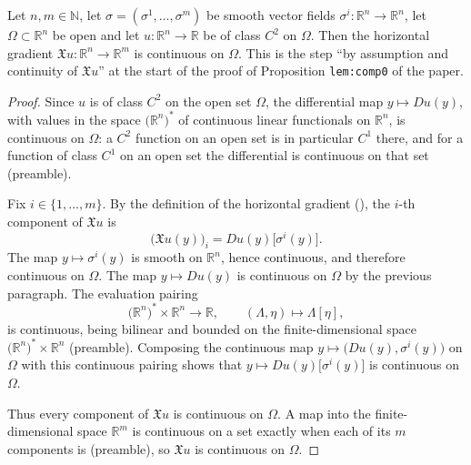 \begin{lemma}
Let $n,m\in\mathbb{N}$, let $\sigma=(\sigma^1,\dots,\sigma^m)$ be smooth vector fields
$\sigma^i:\mathbb{R}^n\to\mathbb{R}^n$, let $\Omega\subset\mathbb{R}^n$ be open and let
$u:\mathbb{R}^n\to\mathbb{R}$ be of class $C^2$ on $\Omega$. Then the horizontal gradient
$\mathfrak{X}u:\mathbb{R}^n\to\mathbb{R}^m$ is continuous on $\Omega$. This is the step ``by
assumption and continuity of $\mathfrak{X}u$'' at the start of the proof of Proposition
\texttt{lem:comp0} of the paper.
\end{lemma}
\begin{proof}
Since $u$ is of class $C^2$ on the open set $\Omega$, the differential map
$y\mapsto Du(y)$, with values in the space $\big(\mathbb{R}^n\big)^*$ of continuous linear
functionals on $\mathbb{R}^n$, is continuous on $\Omega$: a $C^2$ function on an open set is in
particular $C^1$ there, and for a function of class $C^1$ on an open set the differential is
continuous on that set (preamble).

Fix $i\in\{1,\dots,m\}$. By the definition of the horizontal gradient (), the
$i$-th component of $\mathfrak{X}u$ is
$$\big(\mathfrak{X}u(y)\big)_i=Du(y)\big[\sigma^i(y)\big].$$
The map $y\mapsto\sigma^i(y)$ is smooth on $\mathbb{R}^n$, hence continuous, and therefore
continuous on $\Omega$. The map $y\mapsto Du(y)$ is continuous on $\Omega$ by the previous
paragraph. The evaluation pairing
$$\big(\mathbb{R}^n\big)^*\times\mathbb{R}^n\to\mathbb{R},\qquad(\Lambda,\eta)\mapsto\Lambda[\eta],$$
is continuous, being bilinear and bounded on the finite-dimensional space
$\big(\mathbb{R}^n\big)^*\times\mathbb{R}^n$ (preamble). Composing the continuous map
$y\mapsto\big(Du(y),\sigma^i(y)\big)$ on $\Omega$ with this continuous pairing shows that
$y\mapsto Du(y)\big[\sigma^i(y)\big]$ is continuous on $\Omega$.

Thus every component of $\mathfrak{X}u$ is continuous on $\Omega$. A map into the
finite-dimensional space $\mathbb{R}^m$ is continuous on a set exactly when each of its $m$
components is (preamble), so $\mathfrak{X}u$ is continuous on $\Omega$.
\end{proof}
